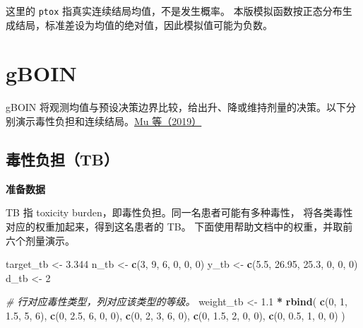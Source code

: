 \documentclass[
  chinese,
]{article}
\newenvironment{Shaded}{\begin{snugshade}}{\end{snugshade}}
\newcommand{\CommentTok}[1]{\textcolor[rgb]{0.56,0.35,0.01}{\textit{#1}}}
\newcommand{\DecValTok}[1]{\textcolor[rgb]{0.00,0.00,0.81}{#1}}
\newcommand{\FloatTok}[1]{\textcolor[rgb]{0.00,0.00,0.81}{#1}}
\newcommand{\FunctionTok}[1]{\textcolor[rgb]{0.13,0.29,0.53}{\textbf{#1}}}
\newcommand{\NormalTok}[1]{#1}
\newcommand{\OtherTok}[1]{\textcolor[rgb]{0.56,0.35,0.01}{#1}}
\newcommand{\SpecialCharTok}[1]{\textcolor[rgb]{0.81,0.36,0.00}{\textbf{#1}}}
\begin{document}
这里的 \texttt{ptox} 指真实连续结局均值，不是发生概率。
本版模拟函数按正态分布生成结局，标准差设为均值的绝对值，因此模拟值可能为负数。

\section{gBOIN}\label{gboin}

gBOIN
将观测均值与预设决策边界比较，给出升、降或维持剂量的决策。以下分别演示毒性负担和连续结局。\hyperref[ux53c2ux8003ux8d44ux6599]{Mu
等（2019）}

\subsection{毒性负担（TB）}\label{ux6bd2ux6027ux8d1fux62c5tb}

\textbf{准备数据}

TB 指 toxicity burden，即毒性负担。同一名患者可能有多种毒性，
将各类毒性对应的权重加起来，得到这名患者的 TB。
下面使用帮助文档中的权重，并取前六个剂量演示。

\begin{Shaded}
\begin{Highlighting}[]
\NormalTok{target\_tb }\OtherTok{\textless{}{-}} \FloatTok{3.344}
\NormalTok{n\_tb }\OtherTok{\textless{}{-}} \FunctionTok{c}\NormalTok{(}\DecValTok{3}\NormalTok{, }\DecValTok{9}\NormalTok{, }\DecValTok{6}\NormalTok{, }\DecValTok{0}\NormalTok{, }\DecValTok{0}\NormalTok{, }\DecValTok{0}\NormalTok{)}
\NormalTok{y\_tb }\OtherTok{\textless{}{-}} \FunctionTok{c}\NormalTok{(}\FloatTok{5.5}\NormalTok{, }\FloatTok{26.95}\NormalTok{, }\FloatTok{25.3}\NormalTok{, }\DecValTok{0}\NormalTok{, }\DecValTok{0}\NormalTok{, }\DecValTok{0}\NormalTok{)}
\NormalTok{d\_tb }\OtherTok{\textless{}{-}} \DecValTok{2}

\CommentTok{\# 行对应毒性类型，列对应该类型的等级。}
\NormalTok{weight\_tb }\OtherTok{\textless{}{-}} \FloatTok{1.1} \SpecialCharTok{*} \FunctionTok{rbind}\NormalTok{(}
  \FunctionTok{c}\NormalTok{(}\DecValTok{0}\NormalTok{, }\DecValTok{1}\NormalTok{, }\FloatTok{1.5}\NormalTok{, }\DecValTok{5}\NormalTok{, }\DecValTok{6}\NormalTok{),}
  \FunctionTok{c}\NormalTok{(}\DecValTok{0}\NormalTok{, }\FloatTok{2.5}\NormalTok{, }\DecValTok{6}\NormalTok{, }\DecValTok{0}\NormalTok{, }\DecValTok{0}\NormalTok{),}
  \FunctionTok{c}\NormalTok{(}\DecValTok{0}\NormalTok{, }\DecValTok{2}\NormalTok{, }\DecValTok{3}\NormalTok{, }\DecValTok{6}\NormalTok{, }\DecValTok{0}\NormalTok{),}
  \FunctionTok{c}\NormalTok{(}\DecValTok{0}\NormalTok{, }\FloatTok{1.5}\NormalTok{, }\DecValTok{2}\NormalTok{, }\DecValTok{0}\NormalTok{, }\DecValTok{0}\NormalTok{),}
  \FunctionTok{c}\NormalTok{(}\DecValTok{0}\NormalTok{, }\FloatTok{0.5}\NormalTok{, }\DecValTok{1}\NormalTok{, }\DecValTok{0}\NormalTok{, }\DecValTok{0}\NormalTok{)}
\NormalTok{)}
\end{Highlighting}
\end{Shaded}
\end{document}
